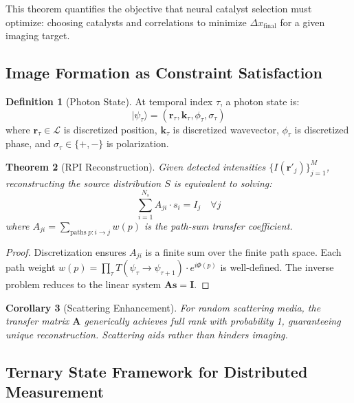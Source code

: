 \documentclass[11pt,a4paper]{article}
\newtheorem{theorem}{Theorem}[section]
\newtheorem{corollary}[theorem]{Corollary}
\theoremstyle{definition}
\newtheorem{definition}[theorem]{Definition}
\theoremstyle{remark}
\begin{document}
This theorem quantifies the objective that neural catalyst selection must optimize: choosing catalysts and correlations to minimize $\Delta x_{\mathrm{final}}$ for a given imaging target.

\subsection{Image Formation as Constraint Satisfaction}

\begin{definition}[Photon State]
At temporal index $\tau$, a photon state is:
\begin{equation}
|\psi_\tau\rangle = (\mathbf{r}_\tau, \mathbf{k}_\tau, \phi_\tau, \sigma_\tau)
\end{equation}
where $\mathbf{r}_\tau \in \mathcal{L}$ is discretized position, $\mathbf{k}_\tau$ is discretized wavevector, $\phi_\tau$ is discretized phase, and $\sigma_\tau \in \{+, -\}$ is polarization.
\end{definition}

\begin{theorem}[RPI Reconstruction]
\label{thm:rpi}
Given detected intensities $\{I(\mathbf{r}'_j)\}_{j=1}^M$, reconstructing the source distribution $S$ is equivalent to solving:
\begin{equation}
\sum_{i=1}^{N_s} A_{ji} \cdot s_i = I_j \quad \forall j
\end{equation}
where $A_{ji} = \sum_{\mathrm{paths}\; p: i \to j} w(p)$ is the path-sum transfer coefficient.
\end{theorem}

\begin{proof}
Discretization ensures $A_{ji}$ is a finite sum over the finite path space. Each path weight $w(p) = \prod_\tau T(\psi_\tau \to \psi_{\tau+1}) \cdot e^{i\Phi(p)}$ is well-defined. The inverse problem reduces to the linear system $\mathbf{A}\mathbf{s} = \mathbf{I}$.
\end{proof}

\begin{corollary}[Scattering Enhancement]
For random scattering media, the transfer matrix $\mathbf{A}$ generically achieves full rank with probability 1, guaranteeing unique reconstruction. Scattering aids rather than hinders imaging.
\end{corollary}

\subsection{Ternary State Framework for Distributed Measurement}
\end{document}
